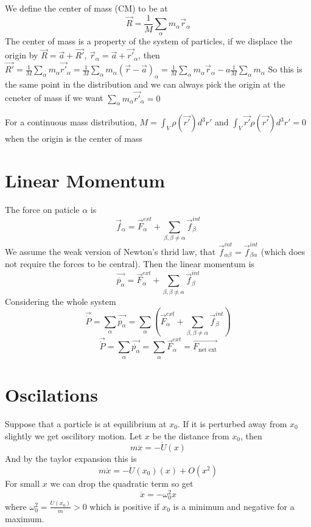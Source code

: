 \documentclass{homework}
\begin{document}
We define the center of mass (CM) to be at
\[\vec{R} = \frac{1}{M}\sum_{\alpha}m_{\alpha}\vec{r}_{\alpha}\]
The center of mass is a property of the system of particles, if we displace the origin by $\vec{R} = \vec{a} + \vec{R'}$, $\vec{r}_{\alpha} = \vec{a} + \vec{r'}_{\alpha}$, then $\vec{R'} = \frac{1}{M}\sum_{\alpha}m_{\alpha}\vec{r'}_{\alpha} = \frac{1}{M}\sum_{\alpha}m_{\alpha}(\vec{r} - \vec{a})_{\alpha} = \frac{1}{M}\sum_{\alpha}m_{\alpha}\vec{r}_{\alpha} -a\frac{1}{M}\sum_{\alpha} m_{\alpha}$
So this is the same point in the distribution and we can always pick the origin at the ceneter of mass if we want $\sum_{\alpha}m_{\alpha}\vec{r'}_{\alpha} = 0$


For a continuous mass distribution, $M = \int_{V} \rho(\vec{r'})d^3r'$ and $ \int_{V} \vec{r'}\rho(\vec{r'})d^3r' = 0$ when the origin is the center of mass

\section{Linear Momentum}

The force on paticle $\alpha$ is 
\[\vec{f}_{\alpha} = \vec{F}_{\alpha}^{ext} + \sum_{\beta, \beta \neq \alpha}\vec{f}_{\beta}^{int}\]
We assume the weak version of Newton's thrid law, that $\vec{f}_{\alpha\beta}^{int} = \vec{f}_{\beta\alpha}^{int}$ (which does not require the forces to be central). Then the linear momentum is
\[\vec{\dot{p_{\alpha}}} = \vec{F}_{\alpha}^{ext} + \sum_{\beta, \beta \neq \alpha}\vec{f}_{\beta}^{int}\]
Considering the whole system
\[\vec{\dot{P}} = \sum_{\alpha} \vec{\dot{p_{\alpha}}} = \sum_{\alpha}(\vec{F}_{\alpha}^{ext} + \sum_{\beta, \beta \neq \alpha}\vec{f}_{\beta}^{int})\]
\[\vec{\dot{P}} = \sum_{\alpha} \vec{\dot{p_{\alpha}}} = \sum_{\alpha}\vec{F}_{\alpha}^{ext} = \vec{F_{\text{net ext}} }\]


\section{Oscilations}

Suppose that a particle is at equilibrium at $x_0$. If it is perturbed away from $x_0$ slightly we get oscilitory motion. Let $x$ be the distance from $x_0$, then
\[m\ddot x = -\dot U (x)\]
And by the taylor expansion this is
\[m\ddot x = -\ddot U(x_0)(x) + O(x^2)\]
For small $x$ we can drop the quadratic term so get
\[\ddot x = -\omega_0^2 x\]
where $\omega_0^2 = \frac{\ddot U(x_0)}{m} > 0$ which is positive if $x_0$ is a minimum and negative for a maximum. 
\end{document}
